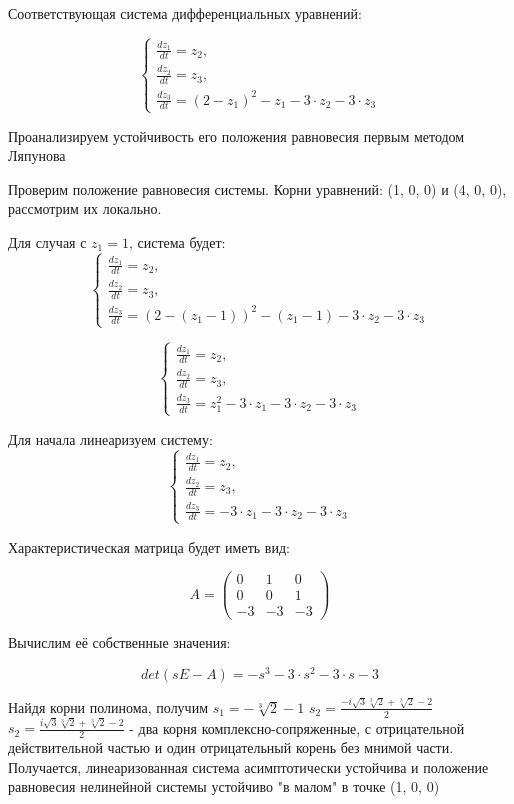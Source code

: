 Соответствующая система дифференциальных уравнений:

$$
\begin{cases}
	\frac{dz_1}{dt} = z_2, \\
	\frac{dz_2}{dt} = z_3, \\
	\frac{dz_3}{dt} = (2 - z_1)^2 - z_1 - 3 \cdot z_2 - 3 \cdot z_3
\end{cases}
$$

Проанализируем устойчивость его положения равновесия первым методом Ляпунова

Проверим положение равновесия системы. Корни уравнений: (1, 0, 0) и (4, 0, 0), рассмотрим их локально.

Для случая с $z_1 = 1$, система будет:
$$
\begin{cases}
	\frac{dz_1}{dt} = z_2, \\
	\frac{dz_2}{dt} = z_3, \\
	\frac{dz_3}{dt} = (2 - (z_1 - 1))^2 - (z_1 - 1) - 3 \cdot z_2 - 3 \cdot z_3
\end{cases}
$$

$$
\begin{cases}
	\frac{dz_1}{dt} = z_2, \\
	\frac{dz_2}{dt} = z_3, \\
	\frac{dz_3}{dt} = z_1^2 - 3 \cdot z_1 - 3 \cdot z_2 - 3 \cdot z_3
\end{cases}
$$

Для начала линеаризуем систему:
$$
\begin{cases}
	\frac{dz_1}{dt} = z_2, \\
	\frac{dz_2}{dt} = z_3, \\
	\frac{dz_3}{dt} = - 3 \cdot z_1 - 3 \cdot z_2 - 3 \cdot z_3
\end{cases}
$$


Характеристическая матрица будет иметь вид:

$$
A = 
\begin{pmatrix}
	0 & 1 & 0 \\
	0 & 0 & 1 \\
	-3 & -3 & -3
\end{pmatrix}
$$

Вычислим её собственные значения:

$$
det(sE - A) = -s^3-3 \cdot s^2-3 \cdot s-3
$$

Найдя корни полинома, получим $s_1 = -\sqrt[3]2-1$ $s_2 = \frac{-i \sqrt{3} \sqrt[3]{2} + \sqrt[3]{2} - 2}{2}$ $s_2 = \frac{i \sqrt{3} \sqrt[3]{2} + \sqrt[3]{2} - 2}{2}$ - два корня комплексно-сопряженные,
с отрицательной действительной частью и один отрицательный корень без мнимой части.
Получается, линеаризованная система асимптотически устойчива и положение равновесия нелинейной системы устойчиво "в малом" в точке (1, 0, 0)

